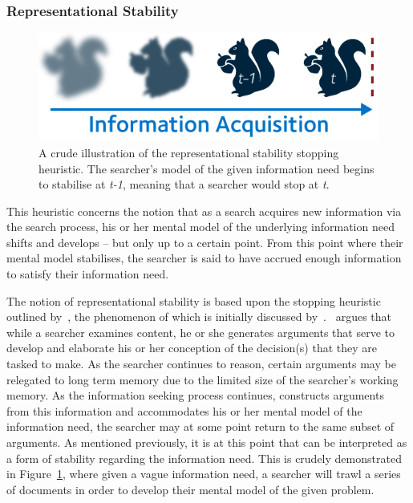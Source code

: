 \subsubsection{Representational Stability}
\begin{figure}
    \begin{center}
    \vspace*{-10mm}
    \includegraphics[width=1\textwidth]{figures/ch3-representational.pdf}
    \end{center}
    \vspace*{-4mm}
    \caption[Representational stability stopping heuristic]{A crude illustration of the representational stability stopping heuristic. The searcher's model of the given information need begins to stabilise at \emph{t-1}, meaning that a searcher would stop at \emph{t}.}
    \label{fig:representational_heuristic}
\end{figure}

This heuristic concerns the notion that as a search acquires new information via the search process, his or her mental model of the underlying information need shifts and develops -- but only up to a certain point. From this point where their mental model stabilises, the searcher is said to have accrued enough information to satisfy their information need.

The notion of representational stability is based upon the stopping heuristic outlined by~\cite{nickles1995judgment}, the phenomenon of which is initially discussed by~\cite{yates1982toward}.~\cite{nickles1995judgment} argues that while a searcher examines content, he or she generates arguments that serve to develop and elaborate his or her conception of the decision(s) that they are tasked to make. As the searcher continues to reason, certain arguments may be relegated to long term memory due to the limited size of the searcher's working memory. As the information seeking process continues, constructs arguments from this information and accommodates his or her mental model of the information need, the searcher may at some point return to the same subset of arguments. As mentioned previously, it is at this point that can be interpreted as a form of stability regarding the information need. This is crudely demonstrated in Figure~\ref{fig:representational_heuristic}, where given a vague information need, a searcher will trawl a series of documents in order to develop their mental model of the given problem.

